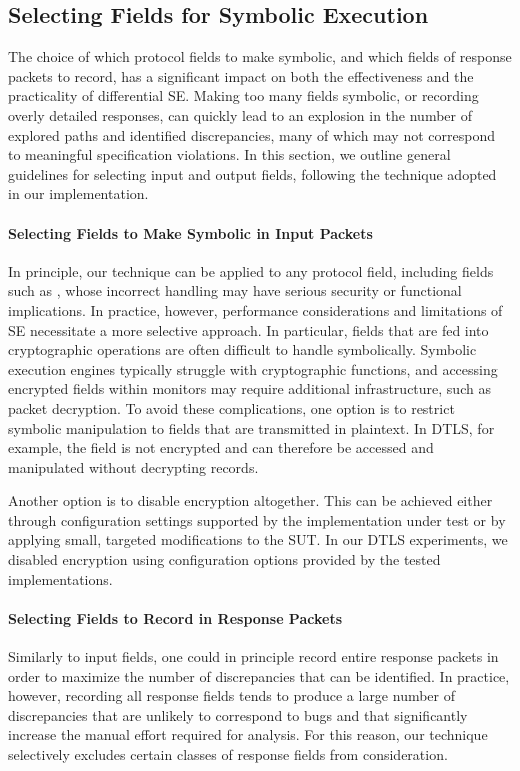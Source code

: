\subsection{Selecting Fields for Symbolic Execution}
The choice of which protocol fields to make symbolic, and which fields of response packets to record, has a significant impact on both the effectiveness and the practicality of differential SE.
Making too many fields symbolic, or recording overly detailed responses, can quickly lead to an explosion in the number of explored paths and identified discrepancies, many of which may not correspond to meaningful specification violations.
In this section, we outline general guidelines for selecting input and output fields, following the technique adopted in our implementation.

\paragraph{Selecting Fields to Make Symbolic in Input Packets}
In principle, our technique can be applied to any protocol field, including fields such as , whose incorrect handling may have serious security or functional implications.
In practice, however, performance considerations and limitations of SE necessitate a more selective approach.
In particular, fields that are fed into cryptographic operations are often difficult to handle symbolically.
Symbolic execution engines typically struggle with cryptographic functions, and accessing encrypted fields within monitors may require additional infrastructure, such as packet decryption.
To avoid these complications, one option is to restrict symbolic manipulation to fields that are transmitted in plaintext.
In DTLS, for example, the  field is not encrypted and can therefore be accessed and manipulated without decrypting records.

Another option is to disable encryption altogether.
This can be achieved either through configuration settings supported by the implementation under test or by applying small, targeted modifications to the SUT.
In our DTLS experiments, we disabled encryption using configuration options provided by the tested implementations.
\paragraph{Selecting Fields to Record in Response Packets}\label{sec:outputfieldselection}
Similarly to input fields, one could in principle record entire response packets in order to maximize the number of discrepancies that can be identified.
In practice, however, recording all response fields tends to produce a large number of discrepancies that are unlikely to correspond to bugs and that significantly increase the manual effort required for analysis.
For this reason, our technique selectively excludes certain classes of response fields from consideration.

